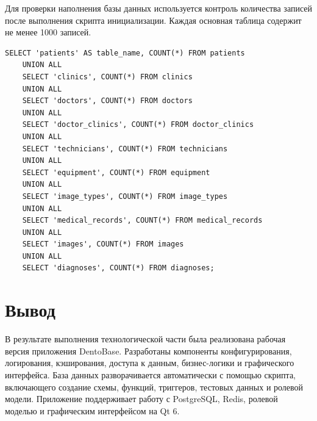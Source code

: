Для проверки наполнения базы данных используется контроль количества записей после выполнения скрипта инициализации. Каждая основная таблица содержит не менее 1000 записей.

\begin{lstlisting}[caption={Проверка количества записей в таблицах}]
	SELECT 'patients' AS table_name, COUNT(*) FROM patients
	UNION ALL
	SELECT 'clinics', COUNT(*) FROM clinics
	UNION ALL
	SELECT 'doctors', COUNT(*) FROM doctors
	UNION ALL
	SELECT 'doctor_clinics', COUNT(*) FROM doctor_clinics
	UNION ALL
	SELECT 'technicians', COUNT(*) FROM technicians
	UNION ALL
	SELECT 'equipment', COUNT(*) FROM equipment
	UNION ALL
	SELECT 'image_types', COUNT(*) FROM image_types
	UNION ALL
	SELECT 'medical_records', COUNT(*) FROM medical_records
	UNION ALL
	SELECT 'images', COUNT(*) FROM images
	UNION ALL
	SELECT 'diagnoses', COUNT(*) FROM diagnoses;
\end{lstlisting}

\section*{Вывод}

В результате выполнения технологической части была реализована рабочая версия приложения DentoBase. Разработаны компоненты конфигурирования, логирования, кэширования, доступа к данным, бизнес-логики и графического интерфейса. База данных разворачивается автоматически с помощью скрипта, включающего создание схемы, функций, триггеров, тестовых данных и ролевой модели. Приложение поддерживает работу с PostgreSQL, Redis, ролевой моделью и графическим интерфейсом на Qt 6.